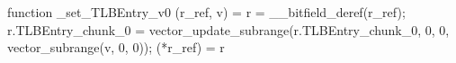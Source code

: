function _set_TLBEntry_v0 (r_ref, v) = {
    r = __bitfield_deref(r_ref);
    r.TLBEntry_chunk_0 = vector_update_subrange(r.TLBEntry_chunk_0, 0, 0, vector_subrange(v, 0, 0));
    (*r_ref) = r
}
